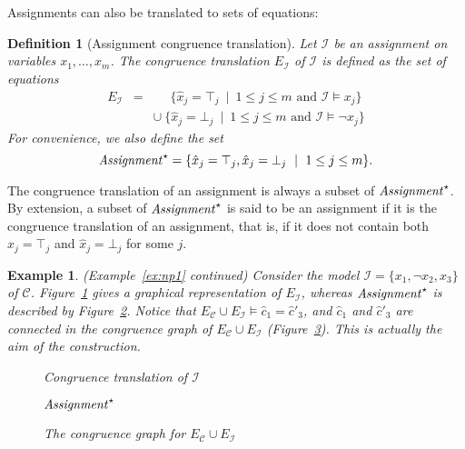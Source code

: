 \documentclass{easychair}
\newtheorem{example}{Example}
\newtheorem{definition}{Definition}
\begin{document}
Assignments can also be translated to sets of equations:
\begin{definition}[Assignment congruence translation]
Let $\mathcal{I}$ be an assignment on variables $x_1,\ldots,x_m$.
The congruence translation $E_{\mathcal{I}}$ of $\mathcal{I}$ is defined as the set of equations
\begin{eqnarray*}
  E_{\mathcal{I}} & = & \phantom{\cup}\ \{ \hat{x}_j = \top_j \ \mid\  1 \leq j \leq m \text{ and } \mathcal{I} \models x_j \} \\
               &   & \cup\ \{ \hat{x}_j = \bot_j \ \mid\ 1 \leq j \leq m \text{ and } \mathcal{I} \models \neg x_j \}
\end{eqnarray*}
For convenience, we also define the set
\begin{equation*}
  {\it Assignment}^\star = \{ \hat{x}_j = \top_j, \hat{x}_j = \bot_j \ \mid\ 1 \leq j \leq m\}.
\end{equation*}
\end{definition}
\noindent
The congruence translation of an assignment is always a subset of
${\it Assignment}^\star$.  By extension, a subset of ${\it Assignment}^\star$ is
said to be an assignment if it is the congruence translation of an assignment,
that is, if it does not contain both $\hat{x}_j = \top_j$ and $\hat{x}_j =
\bot_j$ for some $j$.

\begin{example}\label{ex:np2} (Example~\ref{ex:np1} continued)  
Consider the model $\mathcal{I} = \{x_1, \neg x_2, x_3\}$ of\/ $\mathcal{C}$.
Figure~\ref{fig:npassignment} gives a graphical representation of
$E_{\mathcal{I}}$, whereas ${\it Assignment}^\star$ is described by
Figure~\ref{fig:npassignmentstar}.  Notice that
$E_{\mathcal{C}} \cup E_{\mathcal{I}} \models \hat{c}_1 = \hat{c}'_3$,
and $\hat{c}_1$ and $\hat{c}'_3$ are connected in the congruence graph
of $E_{\mathcal{C}} \cup E_{\mathcal{I}}$ (Figure~\ref{fig:npmodel}).
This is actually the aim of the construction.

\begin{figure}[ht]

\caption{Congruence translation of $\mathcal{I}$}
\label{fig:npassignment}
\end{figure}

\begin{figure}[ht]

\caption{${\it Assignment}^\star$}
\label{fig:npassignmentstar}
\end{figure}
\begin{figure}[ht]

\caption{The congruence graph for $E_{\mathcal{C}} \cup E_{\mathcal{I}}$}
\label{fig:npmodel}
\end{figure}
\end{example}
\end{document}
